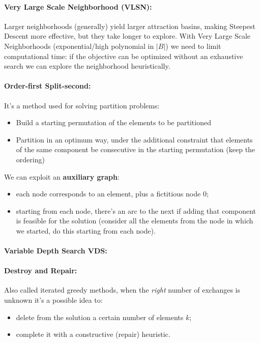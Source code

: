 \documentclass{article}
\begin{document}
	\paragraph{Very Large Scale Neighborhood (VLSN):} Larger neighborhoods (generally) yield larger attraction basins, making Steepest Descent more effective, but they take longer to explore. With Very Large Scale Neighborhoods (exponential/high polynomial in $|B|$) we need to limit computational time: if the objective can be optimized without an exhaustive search we can explore the neighborhood heuristically.\\
	
	\paragraph{Order-first Split-second:} It's a method used for solving partition problems:
	\begin{itemize}
		\item Build a starting permutation of the elements to be partitioned
		\item Partition in an optimum way, under the additional constraint that elements of the same component be consecutive in the starting permutation (keep the ordering)
	\end{itemize}
	We can exploit an \textbf{auxiliary graph}: 
	\begin{itemize}
		\item each node corresponds to an element, plus a fictitious node $0$;
		\item starting from each node, there's an arc to the next if adding that component is feasible for the solution (consider all the elements from the node in which we started, do this starting from each node).\\
	\end{itemize}
	
	\paragraph{Variable Depth Search VDS:}
	
	\paragraph{Destroy and Repair:} Also called iterated greedy methods, when the \textit{right} number of exchanges is unknown it's a possible idea to:
	\begin{itemize}
		\item delete from the solution a certain number of elements $k$;
		\item complete it with a constructive (repair) heuristic.\\
	\end{itemize}
	
\end{document}
